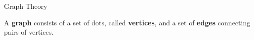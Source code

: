    \begin{frame}[fragile]{Graph Theory}

\begin{definition}
A \textbf{graph} consists of a set of dots, called \textbf{vertices}, and a set of \textbf{edges} connecting pairs of vertices.  
\end{definition}

%
%
%





\end{frame}
